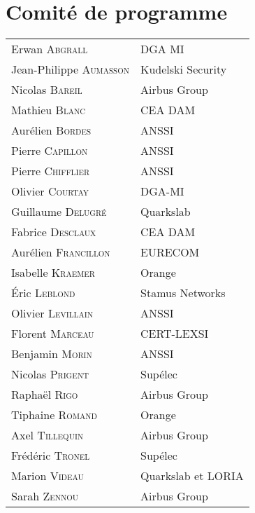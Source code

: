 \section*{Comité de programme}
\begin{tabular}{@{}p{5cm}@{}p{6.5cm}@{}}
  Erwan \textsc{Abgrall}          & DGA MI                                       \\
  Jean-Philippe \textsc{Aumasson} & Kudelski Security                            \\
  Nicolas \textsc{Bareil}         & Airbus Group                                 \\
  Mathieu \textsc{Blanc}          & CEA DAM                                      \\
  Aurélien \textsc{Bordes}        & ANSSI                                        \\
  Pierre   \textsc{Capillon}      & ANSSI                                        \\
  Pierre   \textsc{Chifflier}     & ANSSI                                        \\
  Olivier  \textsc{Courtay}       & DGA-MI                                       \\
  Guillaume \textsc{Delugré}      & Quarkslab                                    \\
  Fabrice \textsc{Desclaux}       & CEA DAM                                      \\
  Aurélien \textsc{Francillon}    & EURECOM                                      \\
  Isabelle \textsc{Kraemer}       & Orange                                       \\
  Éric \textsc{Leblond}           & Stamus Networks                              \\
  Olivier \textsc{Levillain}      & ANSSI                                        \\
  Florent \textsc{Marceau}        & CERT-LEXSI                                   \\
  Benjamin \textsc{Morin}         & ANSSI                                        \\
  Nicolas \textsc{Prigent}        & Sup\'elec                                    \\
  Raphaël \textsc{Rigo}           & Airbus Group                                 \\
  Tiphaine \textsc{Romand}        & Orange                                       \\
  Axel \textsc{Tillequin}         & Airbus Group                                 \\
  Fr\'ed\'eric \textsc{Tronel}    & Sup\'elec                                    \\
  Marion \textsc{Videau}          & Quarkslab et LORIA                           \\
  Sarah \textsc{Zennou}           & Airbus Group                                 \\
\end{tabular}

